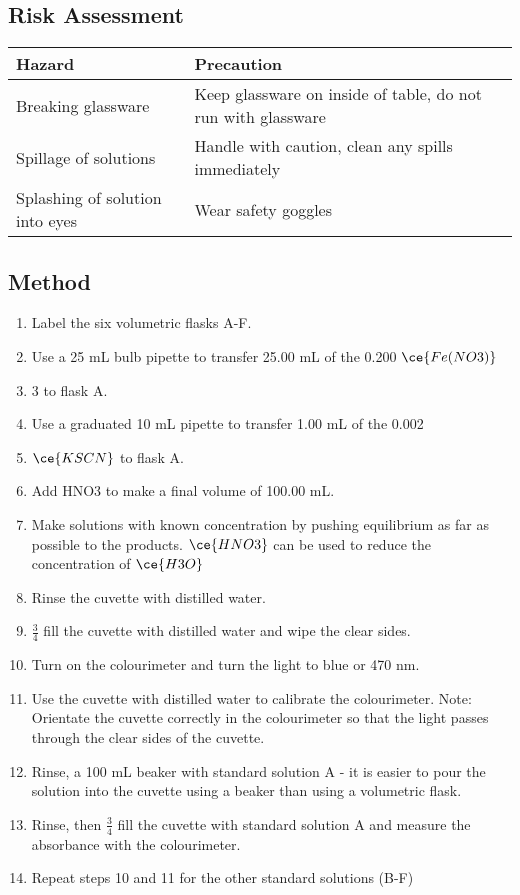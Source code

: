 	\subsection{Risk Assessment}
		\begin{table}[htbp]
			\centering
			\begin{tabular}{ll}
				\hline
				Hazard & Precaution \\ \hline
				Breaking glassware & Keep glassware on inside of table, do not run with glassware \\
				Spillage of solutions & Handle with caution, clean any spills immediately \\
				Splashing of solution into eyes & Wear safety goggles \\ \hline
			\end{tabular}
		\end{table}
	
	\subsection{Method}
	\begin{enumerate}
		\item Label the six volumetric flasks A-F.
		\item Use a 25 mL bulb pipette to transfer 25.00 mL of the 0.200 \unit{\moLar} $\ce{Fe(NO3)}$\item 3 to flask A.
		\item Use a graduated 10 mL pipette to transfer 1.00 mL of the 0.002 \unit{\moLar} \item $\ce{KSCN}$ to flask A.
		\item Add HNO3 to make a final volume of 100.00 mL.
		\item Make solutions with known concentration by pushing equilibrium as far as possible to the products. $\ce{HNO3}$ can be used to reduce the concentration of $\ce{H3O}$
		\item Rinse the cuvette with distilled water.
		\item $\frac{3}{4}$ fill the cuvette with distilled water and wipe the clear sides. 
		\item Turn on the colourimeter and turn the light to blue or 470 nm.
		\item Use the cuvette with distilled water to calibrate the colourimeter. Note: Orientate the cuvette correctly in the colourimeter so that the light passes through the clear sides of the cuvette.
		\item Rinse, a 100 mL beaker with standard solution A - it is easier to pour the solution into the cuvette using a beaker than using a volumetric flask.
		\item Rinse, then $\frac{3}{4}$ fill the cuvette with standard solution A and measure the absorbance with the colourimeter.
		\item Repeat steps 10 and 11 for the other standard solutions (B-F)
	\end{enumerate}

